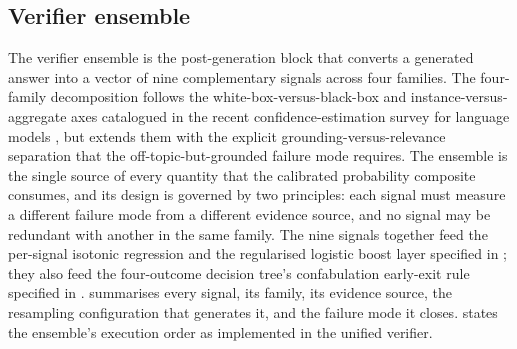 \subsection{Verifier ensemble}
\label{sec:verifier}

The verifier ensemble is the post-generation block that converts a generated answer into a vector of nine complementary signals across four families. The four-family decomposition follows the white-box-versus-black-box and instance-versus-aggregate axes catalogued in the recent confidence-estimation survey for language models \cite{geng2024survey}, but extends them with the explicit grounding-versus-relevance separation that the off-topic-but-grounded failure mode requires. The ensemble is the single source of every quantity that the calibrated probability composite consumes, and its design is governed by two principles: each signal must measure a different failure mode from a different evidence source, and no signal may be redundant with another in the same family. The nine signals together feed the per-signal isotonic regression and the regularised logistic boost layer specified in ; they also feed the four-outcome decision tree's confabulation early-exit rule specified in .  summarises every signal, its family, its evidence source, the resampling configuration that generates it, and the failure mode it closes.  states the ensemble's execution order as implemented in the unified verifier.

